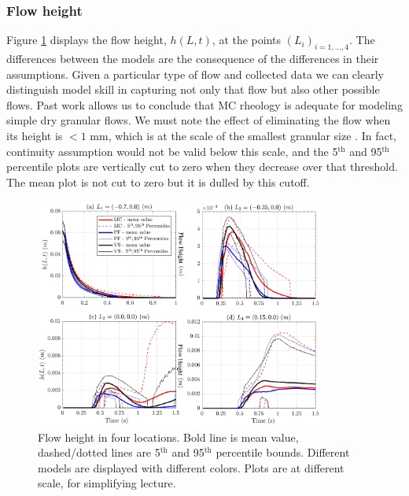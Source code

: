 \documentclass{article}
\begin{document}
\subsubsection{Flow height}
Figure \ref{fig:Ramp-H} displays the flow height, $h(L,t)$, at the points $(L_i)_{i=1,\dots,4}$. The differences between the models are the consequence of the differences in their assumptions. Given a particular type of flow and collected data we can clearly distinguish model skill in capturing not only that flow but also other possible flows. Past work \cite{Webb2004} allows us to conclude that MC rheology is adequate for modeling simple dry granular flows. We must note the effect of eliminating the flow when its height is $<1$ mm, which is at the scale of the smallest granular size \citep{Aghakhani2016}. In fact, continuity assumption would not be valid below this scale, and the 5$^{\mathrm{th}}$ and 95$^{\mathrm{th}}$ percentile plots are vertically cut to zero when they decrease over that threshold. The mean plot is not cut to zero but it is dulled by this cutoff.
\begin{figure}[H]
         \centering
        \includegraphics[width=0.85\textwidth]{InclinedPlane/LocalMeasurments/Height.png}
        \caption{Flow height in four locations. Bold line is mean value, dashed/dotted lines are 5$^{\mathrm{th}}$ and 95$^{\mathrm{th}}$ percentile bounds. Different models are displayed with different colors. Plots are at different scale, for simplifying lecture.}
        \label{fig:Ramp-H}
\end{figure}
\end{document}

